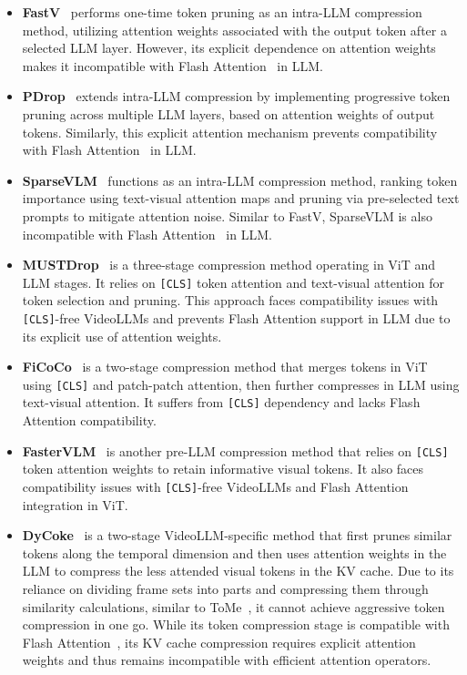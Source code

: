 \begin{itemize}

    \item \textbf{FastV}~\cite{Chen:FastV} performs one-time token pruning as an intra-LLM compression method, utilizing attention weights associated with the output token after a selected LLM layer. However, its explicit dependence on attention weights makes it incompatible with Flash Attention~\cite{Dao2022:FlashAttention} in LLM.

    \item \textbf{PDrop}~\cite{xing2024pdrop} extends intra-LLM compression by implementing progressive token pruning across multiple LLM layers, based on attention weights of output tokens. Similarly, this explicit attention mechanism prevents compatibility with Flash Attention~\cite{Dao2022:FlashAttention} in LLM.
    
    \item \textbf{SparseVLM}~\cite{Zhang:SparseVLM} functions as an intra-LLM compression method, ranking token importance using text-visual attention maps and pruning via pre-selected text prompts to mitigate attention noise. Similar to FastV, SparseVLM is also incompatible with Flash Attention~\cite{Dao2022:FlashAttention} in LLM.

    \item \textbf{MUSTDrop}~\cite{Liu2024:MUSTDrop} is a three-stage compression method operating in ViT and LLM stages. It relies on \texttt{[CLS]} token attention and text-visual attention for token selection and pruning. This approach faces compatibility issues with \texttt{[CLS]}-free VideoLLMs and prevents Flash Attention support in LLM due to its explicit use of attention weights.
    
    \item \textbf{FiCoCo}~\cite{Han2024:FiCoCo} is a two-stage compression method that merges tokens in ViT using \texttt{[CLS]} and patch-patch attention, then further compresses in LLM using text-visual attention. It suffers from \texttt{[CLS]} dependency and lacks Flash Attention compatibility.


    \item \textbf{FasterVLM}~\cite{Zhang:FasterVLM} is another pre-LLM compression method that relies on \texttt{[CLS]} token attention weights to retain informative visual tokens. It also faces compatibility issues with \texttt{[CLS]}-free VideoLLMs and Flash Attention integration in ViT.
    
    \item \textbf{DyCoke}~\cite{tao2024dycoke} is a two-stage VideoLLM-specific method that first prunes similar tokens along the temporal dimension and then uses attention weights in the LLM to compress the less attended visual tokens in the KV cache. Due to its reliance on dividing frame sets into parts and compressing them through similarity calculations, similar to ToMe~\cite{Bolya:ToMe}, it cannot achieve aggressive token compression in one go. While its token compression stage is compatible with Flash Attention~\cite{Dao2022:FlashAttention}, its KV cache compression requires explicit attention weights and thus remains incompatible with efficient attention operators.


\end{itemize}
